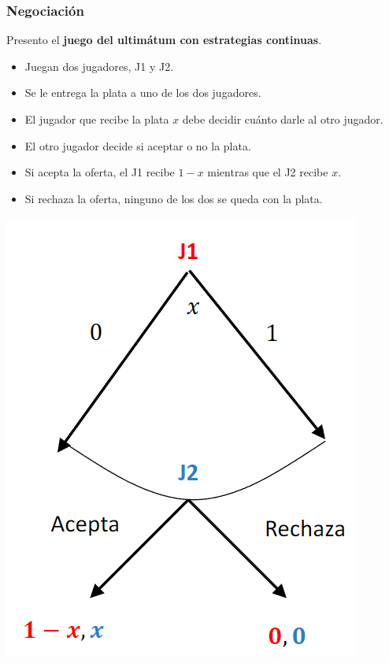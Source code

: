 \documentclass{article}
\begin{document}
            \subsubsection*{Negociación}
                Presento el \textbf{juego del ultimátum con estrategias continuas}.
                \begin{itemize}
                    \item Juegan dos jugadores, J1 y J2.
                    \item Se le entrega la plata a uno de los dos jugadores.
                    \item El jugador que recibe la plata $x$ debe decidir cuánto darle al otro jugador.
                    \item El otro jugador decide si aceptar o no la plata.
                    \item Si acepta la oferta, el J1 recibe $1-x$ mientras que el J2 recibe $x$.
                    \item Si rechaza la oferta, ninguno de los dos se queda con la plata.
                \end{itemize}
                \begin{center}
                    \includegraphics[width=0.3 \linewidth]{figs/ultimatum.png}
                \end{center}
\end{document}
